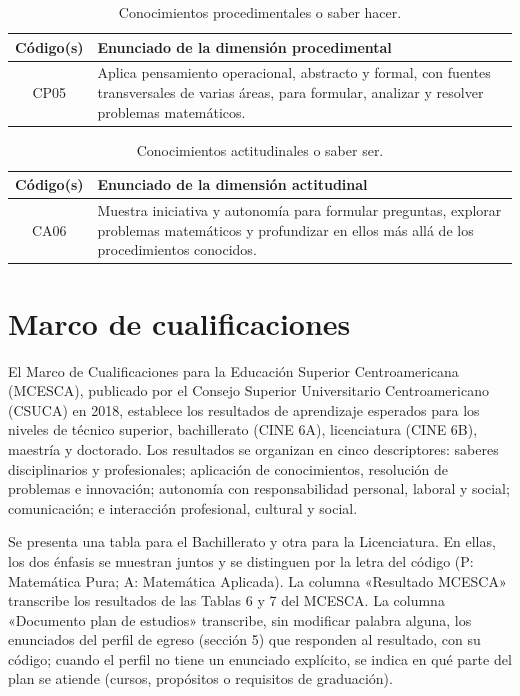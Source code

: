 \documentclass[11pt,a4paper]{article}
\begin{document}

\begin{table}[H]
\centering
\renewcommand{\arraystretch}{1.3}
\begin{tabular}{|c|p{9cm}|}
\hline
\cellcolor[HTML]{00C0F3}\textbf{Código(s)}  & \cellcolor[HTML]{00C0F3}\textbf{Enunciado de la dimensión procedimental} \\
\hline
CP05 & Aplica pensamiento operacional, abstracto y formal, con fuentes transversales de varias áreas, para formular, analizar y resolver problemas matemáticos. \\
\hline
\end{tabular}
\caption{Conocimientos procedimentales o saber hacer.}
\end{table}


\begin{table}[H]
\centering
\renewcommand{\arraystretch}{1.3}
\begin{tabular}{|c|p{9cm}|}
\hline
\cellcolor[HTML]{00C0F3}\textbf{Código(s)} & \cellcolor[HTML]{00C0F3}\textbf{Enunciado de la dimensión actitudinal} \\
\hline
CA06 & Muestra iniciativa y autonomía para formular preguntas, explorar problemas matemáticos y profundizar en ellos más allá de los procedimientos conocidos.\\
\hline
\end{tabular}
\caption{Conocimientos actitudinales o saber ser.}
\end{table}

\section{Marco de cualificaciones}

El Marco de Cualificaciones para la Educación Superior Centroamericana (MCESCA), publicado por el Consejo Superior Universitario Centroamericano (CSUCA) en 2018, establece los resultados de aprendizaje esperados para los niveles de técnico superior, bachillerato (CINE 6A), licenciatura (CINE 6B), maestría y doctorado. Los resultados se organizan en cinco descriptores: saberes disciplinarios y profesionales; aplicación de conocimientos, resolución de problemas e innovación; autonomía con responsabilidad personal, laboral y social; comunicación; e interacción profesional, cultural y social.

Se presenta una tabla para el Bachillerato y otra para la Licenciatura. En ellas, los dos énfasis se muestran juntos y se distinguen por la letra del código (P: Matemática Pura; A: Matemática Aplicada). La columna «Resultado MCESCA» transcribe los resultados de las Tablas 6 y 7 del MCESCA. La columna «Documento plan de estudios» transcribe, sin modificar palabra alguna, los enunciados del perfil de egreso (sección 5) que responden al resultado, con su código; cuando el perfil no tiene un enunciado explícito, se indica en qué parte del plan se atiende (cursos, propósitos o requisitos de graduación).
\end{document}
